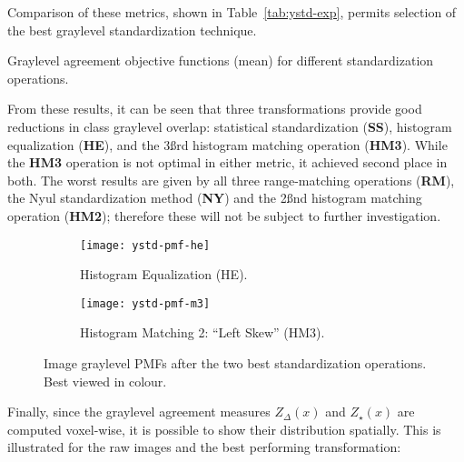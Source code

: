 Comparison of these metrics, shown in Table~\ref{tab:ystd-exp}, permits selection of the 
best graylevel standardization technique.
\par
\begin{table}
  \centering
  \caption{Graylevel agreement objective functions (mean) for different standardization operations.}%
  \label{tab:ystd-exp}
  
\end{table}
From these results, it can be seen that three transformations provide
good reductions in class graylevel overlap:
statistical standardization (\textbf{SS}),
histogram equalization (\textbf{HE}),
and the 3\ss{rd} histogram matching operation (\textbf{HM3}).
While the \textbf{HM3} operation is not optimal in either metric,
it achieved second place in both.
The worst results are given by
all three range-matching operations (\textbf{RM}),
the Nyul standardization method (\textbf{NY})
and the 2\ss{nd} histogram matching operation (\textbf{HM2});
therefore these will not be subject to further investigation.
\begin{figure}
  \centering
  \begin{subfigure}{\plotwidth}
    \texttt{[image: ystd-pmf-he]}
    \caption{Histogram Equalization (HE).}%
    \label{fig:ystd-pmf-he}
  \end{subfigure}
  \begin{subfigure}{\plotwidth}
    \texttt{[image: ystd-pmf-m3]}
    \caption{Histogram Matching 2: ``Left Skew'' (HM3).}%
    \label{fig:ystd-pmf-hm2}
  \end{subfigure}
  \caption{Image graylevel PMFs after the two best standardization operations.
    Best viewed in colour.}%
  \label{fig:ystd-pmf-best}
\end{figure}
Finally, since the graylevel agreement measures $Z_{\Delta}(x)$ and $Z_{\star}(x)$
are computed voxel-wise, it is possible to show their distribution spatially.
This is illustrated for the raw images and the best performing transformation:
